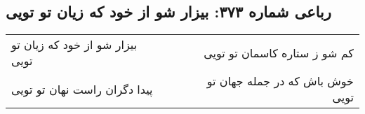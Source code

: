 \begin{center}
\section*{رباعی شماره ۳۷۳: بیزار شو از خود که زیان تو تویی}
\label{sec:sh373}
\begin{longtable}{l p{0.5cm} r}
بیزار شو از خود که زیان تو تویی
&&
کم شو ز ستاره کاسمان تو تویی
\\
پیدا دگران راست نهان تو تویی
&&
خوش باش که در جمله جهان تو تویی
\\
\end{longtable}
\end{center}
